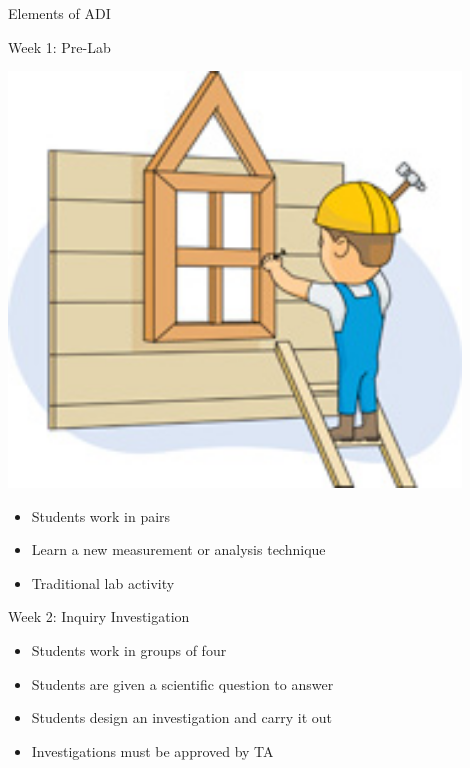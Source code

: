 \documentclass[xcolor=dvipsnames,table]{beamer}
\begin{document}
{\nologo
  \begin{frame}{Elements of ADI}
    \begin{block}{Week 1: Pre-Lab}
      \begin{minipage}{0.2\textwidth}
        \centering \includegraphics[width=0.9\textwidth]{./clipart/house.jpg}
      \end{minipage}\hfill
      \begin{minipage}{0.75\textwidth}
        \begin{itemize}
          \item Students work in pairs
          \item Learn a new measurement or analysis technique
          \item Traditional lab activity
        \end{itemize}
      \end{minipage}
    \end{block}
    \begin{block}{Week 2: Inquiry Investigation}
      \begin{minipage}{0.75\textwidth}
        \begin{itemize}
          \item Students work in groups of four
          \item Students are given a scientific question to answer
          \item Students design an investigation and carry it out
          \item Investigations must be approved by TA

\end{itemize}
\end{minipage}
\end{block}
\end{frame}}
\end{document}
